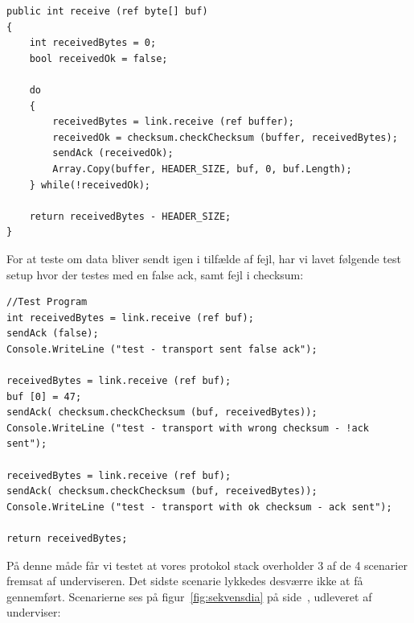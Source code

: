 \begin{lstlisting}
public int receive (ref byte[] buf)
{
	int receivedBytes = 0;
	bool receivedOk = false;
	
	do 
	{
		receivedBytes = link.receive (ref buffer);
		receivedOk = checksum.checkChecksum (buffer, receivedBytes);
		sendAck (receivedOk);
		Array.Copy(buffer, HEADER_SIZE, buf, 0, buf.Length);
	} while(!receivedOk);
	
	return receivedBytes - HEADER_SIZE;
}
\end{lstlisting}

For at teste om data bliver sendt igen i tilfælde af fejl, har vi lavet følgende test setup hvor der testes med
en false ack, samt fejl i checksum:

\begin{lstlisting}
//Test Program
int receivedBytes = link.receive (ref buf);
sendAck (false);
Console.WriteLine ("test - transport sent false ack");

receivedBytes = link.receive (ref buf);
buf [0] = 47;
sendAck( checksum.checkChecksum (buf, receivedBytes));
Console.WriteLine ("test - transport with wrong checksum - !ack sent");

receivedBytes = link.receive (ref buf);
sendAck( checksum.checkChecksum (buf, receivedBytes));
Console.WriteLine ("test - transport with ok checksum - ack sent");

return receivedBytes;
\end{lstlisting}

På denne måde får vi testet at vores protokol stack overholder 3 af de 4 scenarier fremsat af underviseren.
Det sidste scenarie lykkedes desværre ikke at få gennemført. Scenarierne ses på figur~\ref{fig:sekvensdia} på side~\pageref{fig:sekvensdia}, udleveret af
underviser:

